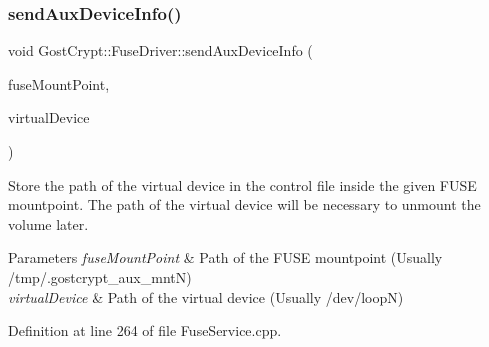 \subsubsection{\texorpdfstring{send\+Aux\+Device\+Info()}{sendAuxDeviceInfo()}}
{\footnotesize\ttfamily void Gost\+Crypt\+::\+Fuse\+Driver\+::send\+Aux\+Device\+Info (\begin{DoxyParamCaption}\item[{Q\+File\+Info}]{fuse\+Mount\+Point,  }\item[{Q\+File\+Info}]{virtual\+Device }\end{DoxyParamCaption})}



Store the path of the virtual device in the control file inside the given F\+U\+SE mountpoint. The path of the virtual device will be necessary to unmount the volume later. 


\begin{DoxyParams}{Parameters}
{\em fuse\+Mount\+Point} & Path of the F\+U\+SE mountpoint (Usually /tmp/.gostcrypt\+\_\+aux\+\_\+mntN) \\
\hline
{\em virtual\+Device} & Path of the virtual device (Usually /dev/loopN) \\
\hline
\end{DoxyParams}


Definition at line 264 of file Fuse\+Service.\+cpp.

